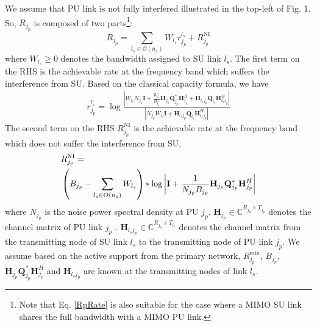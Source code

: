 \documentclass[12pt,onecolumn,tworows]{IEEEtran}
\begin{document}
We assume that PU link is not fully interfered illustrated in the top-left of Fig. 1.
So, $R_{j_p}$  is composed of two parts\footnote{Note that Eq. \eqref{RpRate} is also suitable for the case where a MIMO SU link shares the full bandwidth with a MIMO PU link.}:
\begin{equation}\label{RpRate}
R_{j_p}=\sum\limits_{{l_s} \in \mathcal{O}({n_s})}W_{{l_s}}r_{j_p}^{l_s}+R_{j_p}^{\text{NI}}
\end{equation}
where ${W_{{l_s}}}\geq0$ denotes the bandwidth assigned to SU link ${l_s}$.
The first term on the RHS is the achievable rate at the frequency band which suffers the interference from SU. Based on the classical capacity formula, we have
\begin{equation}\label{3}
\begin{gathered}
  r_{j_p}^{l_s}=\log \frac{{\left|{{W_{{l_s}}}{N_{{j_p}}}} {{\mathbf{I}} + {\frac{{{W_{{l_s}}}}}{{{B_{{j_p}}}}}} {{\mathbf{H}}_{{j_p}}}{\mathbf{Q}}_{{j_p}}^*{\mathbf{H}}_{{j_p}}^H + {{\mathbf{H}}_{{l_s}{j_p}}}{{\mathbf{Q}}_{{l_s}}}{\mathbf{H}}_{{l_s}{j_p}}^H} \right|}}{{\left|{{N_{{j_p}}}{W_{{l_s}}}}{{\mathbf{I}} + {{\mathbf{H}}_{{l_s}{j_p}}}{{\mathbf{Q}}_{{l_s}}}{\mathbf{H}}_{{l_s}{j_p}}^H} \right|}}
\end{gathered}
\end{equation}
The second term on the RHS $R_{j_p}^{\text{NI}}$ is the achievable rate at the frequency band which does not suffer the interference from SU,
\begin{equation}\label{3B}
\begin{aligned}
&R_{{j_p}}^{{\rm{NI}}} =\\
&\left( {{B_{{j_p}}} - \sum\limits_{{l_s} \in O({n_s})} {{W_{{l_s}}}} } \right){\rm{*}}\log \left| {{\bf{I}} + \frac{1}{{{N_{{j_p}}}{B_{{j_p}}}}}{{\bf{H}}_{{j_p}}}{\bf{Q}}_{{j_p}}^*{\bf{H}}_{{j_p}}^H} \right|
\end{aligned}
\end{equation}
where $N_{{j_p}}$ is the noise power spectral density at PU $j_p$.
${{\mathbf{H}}_{{j_p}}} \in {\mathbb{C}^{{R_{{j_p}}} \times {T_{{j_p}}}}}$ denotes the channel matrix of PU link ${j_p}$ .
${{\mathbf{H}}_{{l_s}{j_p}}} \in {\mathbb{C}^{{R_{{j_p}}} \times {T_{{l_s}}}}}$ denotes the channel matrix from the transmitting node of SU link ${l_s}$ to the transmitting node of PU link ${j_p}$.
We assume based on the active support from the primary network, $R_{j_p}^{\text{min}}$, $B_{{j_p}}$, ${{\mathbf{H}}_{{j_p}}}{\mathbf{Q}}_{{j_p}}^*{\mathbf{H}}_{{j_p}}^H$ and ${{\mathbf{H}}_{{l_s}{j_p}}}$ are known at the transmitting nodes of link $l_s$.
\end{document}

